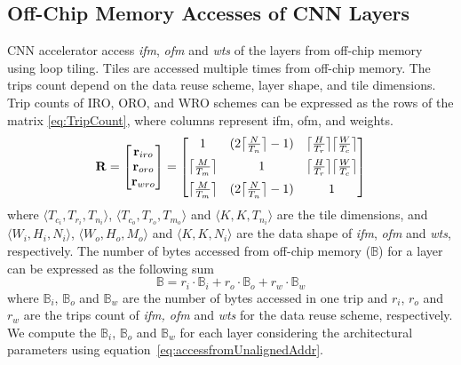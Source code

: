 \documentclass[a4paper,10pt]{article}
\DeclarePairedDelimiter{\ceil}{\lceil}{\rceil}
\newcommand{\numBytesOffChip}{\mathbb{B}}
\begin{document}
\subsection{Off-Chip Memory Accesses of CNN Layers}
CNN accelerator access \textit{ifm}, \textit{ofm} and \textit{wts} of the layers from off-chip memory using loop tiling. Tiles are accessed multiple times from off-chip memory. The trips count depend on the data reuse scheme, layer shape, and tile dimensions. Trip counts of IRO, ORO, and WRO schemes can be expressed as the rows of the matrix \eqref{eq:TripCount}, where columns represent ifm, ofm, and weights.
\begin{align}\label{eq:TripCount}
	\mathbf{R}=
	\begin{bmatrix}
		\mathbf{r}_{iro} \\  \mathbf{r}_{oro} \\ \mathbf{r}_{wro} \\
	\end{bmatrix}= 
	\begin{bmatrix}
		1  & (2\ceil[\big]{\frac{N}{T_n}}-1) & \ceil[\big]{\frac{H}{T_r}} \ceil[\big]{\frac{W}{T_c}}\\[6pt]
		\ceil[\big]{\frac{M}{T_m}} & 1 & \ceil[\big]{\frac{H}{T_r}} \ceil[\big]{\frac{W}{T_c}}\\[6pt]
		\ceil[\big]{\frac{M}{T_m}} & (2\ceil[\big]{\frac{N}{T_n}}-1) & 1\\
	\end{bmatrix}
\end{align}
where $\langle T_{c_i},T_{r_i},T_{n_i}\rangle$, $\langle T_{c_o},T_{r_o},T_{m_o}\rangle$ and $\langle K,K,T_{n_i}\rangle$ are the tile dimensions, and $\langle W_i,H_i,N_i\rangle$, $\langle W_o,H_o,M_o\rangle$ and $\langle K,K,N_i\rangle$ are the data shape of \textit{ifm}, \textit{ofm} and \textit{wts}, respectively. The number of bytes accessed from off-chip memory ($\numBytesOffChip$) for a layer can be expressed as the following sum
\begin{equation}\label{eq:TotalOffChipAccess}
	\numBytesOffChip{}={}{r_{i}}{\cdot}\numBytesOffChip_{i}{+}{r_{o}}{\cdot}\numBytesOffChip_{o}{+}{r_{w}}{\cdot}\numBytesOffChip_{w}
\end{equation}
where $\numBytesOffChip_{i}$, $\numBytesOffChip_{o}$ and $\numBytesOffChip_{w}$ are the number of bytes accessed in one trip and $r_{i}$, $r_{o}$ and $r_{w}$ are the trips count of \textit{ifm, ofm} and \textit{wts} for the data reuse scheme, respectively. We compute the $\numBytesOffChip_{i}$, $\numBytesOffChip_{o}$ and $\numBytesOffChip_{w}$ for each layer considering the architectural parameters using equation~\ref{eq:accessfromUnalignedAddr}.
\end{document}
